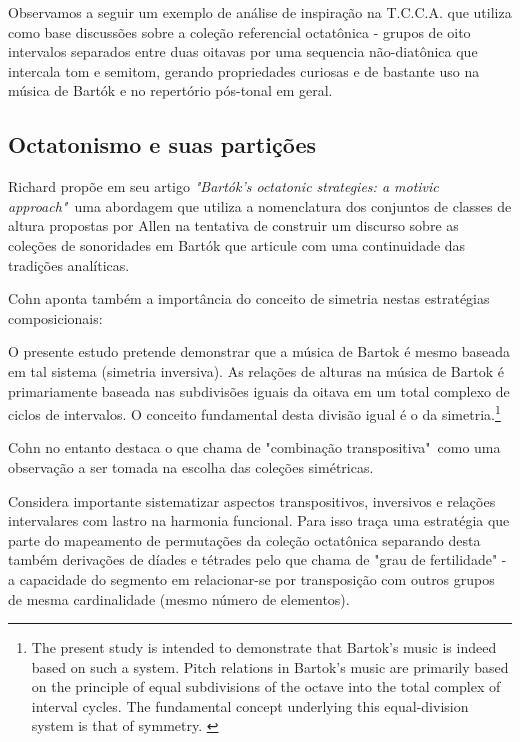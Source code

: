\documentclass[
	12pt,				%
	openright,			%
	twoside,			%
	a4paper,			%
	english,			%
	french,				%
	spanish,			%
	brazil				%
	]{abntex2}
\begin{document}
Observamos a seguir um exemplo de análise de inspiração na T.C.C.A. que utiliza como base discussões sobre a coleção referencial octatônica - grupos de oito intervalos separados entre duas oitavas por uma sequencia não-diatônica que intercala tom e semitom, gerando propriedades curiosas e de bastante uso na música de Bartók e no repertório pós-tonal em geral.


\subsection{Octatonismo e suas partições}
\label{octa}

Richard  propõe em seu artigo \textit{"Bartók's octatonic strategies: a motivic approach"}\ uma abordagem que utiliza a nomenclatura dos conjuntos de classes de altura propostas por Allen  na tentativa de construir um discurso sobre as coleções de sonoridades em Bartók que articule com uma continuidade das tradições analíticas.

Cohn aponta também a importância do conceito de simetria nestas estratégias composicionais:

\begin{citacao}
O presente estudo pretende demonstrar que a música de Bartok é mesmo baseada em tal sistema (simetria inversiva). As relações de alturas na música de Bartok é primariamente baseada nas subdivisões iguais da oitava em um total complexo de ciclos de intervalos. O conceito fundamental desta divisão igual é o da simetria.\cite{cohn1988inversional}\footnote{ The present study is intended to demonstrate that Bartok's music is indeed based on such a system. Pitch relations in Bartok's music are primarily based on the principle of equal subdivisions of the octave into the total complex of interval cycles. The fundamental concept underlying this equal-division system is that of symmetry. \cite{cohn1988inversional}}
\end{citacao}

Cohn no entanto destaca o que chama de "combinação transpositiva"\ como uma observação a ser tomada na escolha das coleções simétricas.

Considera importante sistematizar aspectos transpositivos, inversivos e relações intervalares com lastro na harmonia funcional. Para isso traça uma estratégia que parte do mapeamento de permutações da coleção octatônica separando desta também derivações de díades e tétrades pelo que chama de "grau de fertilidade"\cite[ p.268]{cohn1991bartok} - a capacidade do segmento em relacionar-se por transposição com outros grupos de mesma cardinalidade (mesmo número de elementos).
\end{document}
